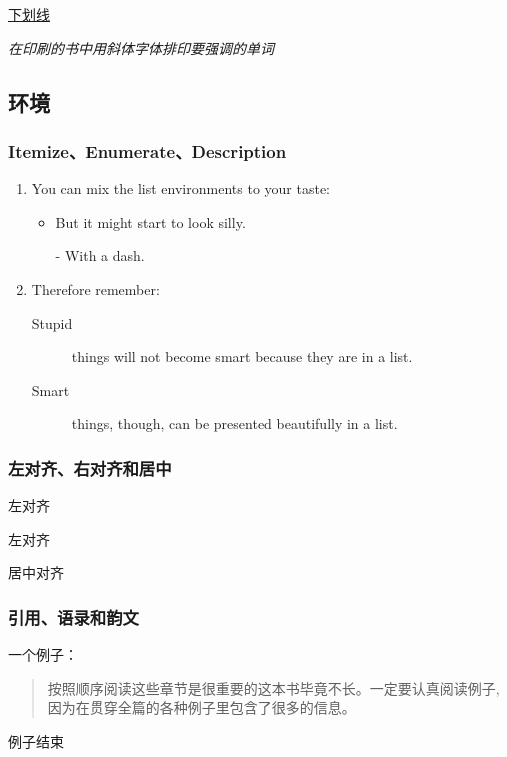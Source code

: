 \documentclass[a4paper,12pt]{article}
\begin{document}
\underline{下划线}

\emph{在印刷的书中用斜体字体排印要强调的单词}

\subsection{环境}

\subsubsection{Itemize、Enumerate、Description}

\flushleft
\begin{enumerate} %
\item You can mix the list environments \cite{1:article} to your taste:
\begin{itemize}
\item But it might start to look silly.
\item[-] With a dash.
\end{itemize}
\item Therefore remember:
\begin{description}
\item[Stupid] things will not become smart because they are in a list.
\item[Smart] things, though, can be presented beautifully in a list.
\end{description}
\end{enumerate}

\subsubsection{左对齐、右对齐和居中}

\begin{flushleft}
左对齐
\end{flushleft}

\begin{flushright}
左对齐
\end{flushright}

\begin{center}
居中对齐
\end{center}

\subsubsection{引用、语录和韵文}

一个例子：
\begin{quote}
按照顺序阅读这些章节是很重要的这本书毕竟不长。一定要认真阅读例子,因为在贯穿全篇的各种例子里包含了很多的信息。

\end{quote}
例子结束
\end{document}
